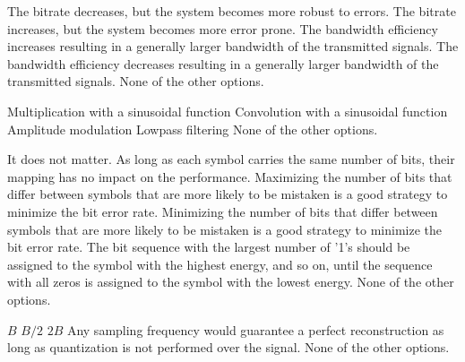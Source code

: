 \begin{checkboxes}
    \choice The bitrate decreases, but the system becomes more robust to errors.
    \CorrectChoice The bitrate increases, but the system becomes more error prone.
    \choice The bandwidth efficiency increases resulting in a generally larger bandwidth of the transmitted signals.
    \choice The bandwidth efficiency decreases resulting in a generally larger bandwidth of the transmitted signals.
    \choice None of the other options.
\end{checkboxes}

\begin{checkboxes}
    \CorrectChoice Multiplication with a sinusoidal function
    \choice Convolution with a sinusoidal function
    \choice Amplitude modulation
    \choice Lowpass filtering
    \choice None of the other options.
\end{checkboxes}

\begin{checkboxes}
    \choice It does not matter. As long as each symbol carries the same number of bits, their mapping has no impact on the performance.
    \choice Maximizing the number of bits that differ between symbols that are more likely to be mistaken is a good strategy to minimize the bit error rate.
    \CorrectChoice Minimizing the number of bits that differ between symbols that are more likely to be mistaken is a good strategy to minimize the bit error rate.
    \choice The bit sequence with the largest number of '1's should be assigned to the symbol with the highest energy, and so on, until the sequence with all zeros is assigned to the symbol with the lowest energy.
    \choice None of the other options.
\end{checkboxes}

\begin{checkboxes}
    \choice $B$
    \choice $B/2$
    \CorrectChoice $2B$
    \choice Any sampling frequency would guarantee a perfect reconstruction as long as quantization is not performed over the signal.
    \choice None of the other options.
\end{checkboxes}